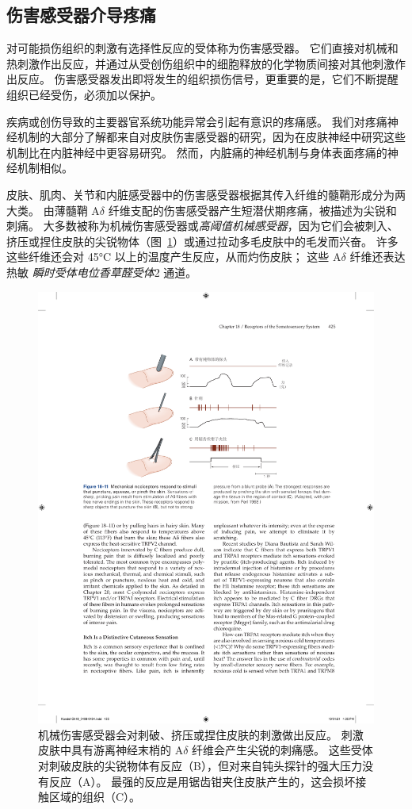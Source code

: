 \subsection{伤害感受器介导疼痛}

对可能损伤组织的刺激有选择性反应的受体称为伤害感受器。
它们直接对机械和热刺激作出反应，并通过从受创伤组织中的细胞释放的化学物质间接对其他刺激作出反应。
伤害感受器发出即将发生的组织损伤信号，更重要的是，它们不断提醒组织已经受伤，必须加以保护。


疾病或创伤导致的主要器官系统功能异常会引起有意识的疼痛感。
我们对疼痛神经机制的大部分了解都来自对皮肤伤害感受器的研究，因为在皮肤神经中研究这些机制比在内脏神经中更容易研究。
然而，内脏痛的神经机制与身体表面疼痛的神经机制相似。


皮肤、肌肉、关节和内脏感受器中的伤害感受器根据其传入纤维的髓鞘形成分为两大类。
由薄髓鞘 A$\delta$ 纤维支配的伤害感受器产生短潜伏期疼痛，被描述为尖锐和刺痛。
大多数被称为机械伤害感受器或\textit{高阈值机械感受器}，因为它们会被刺入、挤压或捏住皮肤的尖锐物体（图~\ref{fig:18_11}）或通过拉动多毛皮肤中的毛发而兴奋。
许多这些纤维还会对 45°C 以上的温度产生反应，从而灼伤皮肤；
这些 A$\delta$ 纤维还表达热敏 \textit{瞬时受体电位香草醛受体}2 通道。


\begin{figure}[htbp]
	\centering
	\includegraphics[width=0.9\linewidth]{chap18/fig_18_11}
	\caption{机械伤害感受器会对刺破、挤压或捏住皮肤的刺激做出反应。
		刺激皮肤中具有游离神经末梢的 A$\delta$ 纤维会产生尖锐的刺痛感。
		这些受体对刺破皮肤的尖锐物体有反应（B），但对来自钝头探针的强大压力没有反应（A）。
		最强的反应是用锯齿钳夹住皮肤产生的，这会损坏接触区域的组织（C）\cite{perl1968myelinated}。}
	\label{fig:18_11}
\end{figure}


